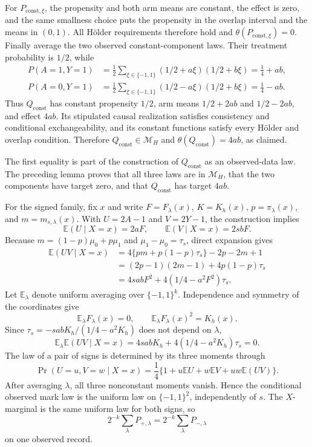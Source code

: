 For \(P_{\mathrm{const},\xi}\), the propensity and both arm means are constant, the effect is zero, and the same smallness choice puts the propensity in the overlap interval and the means in \((0,1)\).  All Hölder requirements therefore hold and \(\theta(P_{\mathrm{const},\xi})=0\).  Finally average the two observed constant-component laws.  Their treatment probability is \(1/2\), while
\[
 \begin{aligned}
 P(A=1,Y=1)&=\frac12\sum_{\xi\in\{-1,1\}}
 (1/2+a\xi)(1/2+b\xi)=\frac14+ab,\\
 P(A=0,Y=1)&=\frac12\sum_{\xi\in\{-1,1\}}
 (1/2-a\xi)(1/2+b\xi)=\frac14-ab.
 \end{aligned}
\]
Thus \(Q_{\mathrm{const}}\) has constant propensity \(1/2\), arm means \(1/2+2ab\) and \(1/2-2ab\), and effect \(4ab\).  Its stipulated causal realization satisfies consistency and conditional exchangeability, and its constant functions satisfy every Hölder and overlap condition.  Therefore \(Q_{\mathrm{const}}\in\mathcal M_H\) and \(\theta(Q_{\mathrm{const}})=4ab\), as claimed.

The first equality is part of the construction of \(Q_{\mathrm{const}}\) as an observed-data law.  The preceding lemma proves that all three laws are in \(\mathcal M_H\), that the two components have target zero, and that \(Q_{\mathrm{const}}\) has target \(4ab\).

For the signed family, fix \(x\) and write \(F=F_\lambda(x)\), \(K=K_h(x)\), \(p=\pi_\lambda(x)\), and \(m=m_{s,\lambda}(x)\).  With \(U=2A-1\) and \(V=2Y-1\), the construction implies
\[
 \mathbb E(U\mid X=x)=2aF,
 \qquad
 \mathbb E(V\mid X=x)=2sbF.
\]
Because \(m=(1-p)\mu_0+p\mu_1\) and \(\mu_1-\mu_0=\tau_s\), direct expansion gives
\[
 \begin{aligned}
 \mathbb E(UV\mid X=x)
 &=4\{pm+p(1-p)\tau_s\}-2p-2m+1\\
 &=(2p-1)(2m-1)+4p(1-p)\tau_s\\
 &=4sabF^2+4(1/4-a^2F^2)\tau_s.
 \end{aligned}
\]
Let \(\mathbb E_\lambda\) denote uniform averaging over \(\{-1,1\}^k\).  Independence and symmetry of the coordinates give
\[
 \mathbb E_\lambda F_\lambda(x)=0,
 \qquad
 \mathbb E_\lambda F_\lambda(x)^2=K_h(x).
\]
Since \(\tau_s=-sabK_h/(1/4-a^2K_h)\) does not depend on \(\lambda\),
\[
 \mathbb E_\lambda\mathbb E(UV\mid X=x)
 =4sabK_h+4(1/4-a^2K_h)\tau_s=0.
\]
The law of a pair of signs is determined by its three moments through
\[
 \Pr(U=u,V=w\mid X=x)
 =\frac14\{1+u\mathbb E U+w\mathbb E V+uw\mathbb E(UV)\}.
\]
After averaging \(\lambda\), all three nonconstant moments vanish.  Hence the conditional observed mark law is the uniform law on \(\{-1,1\}^2\), independently of \(s\).  The \(X\)-marginal is the same uniform law for both signs, so
\[
 2^{-k}\sum_\lambda P_{+,\lambda}
 =2^{-k}\sum_\lambda P_{-,\lambda}
\]
on one observed record.

